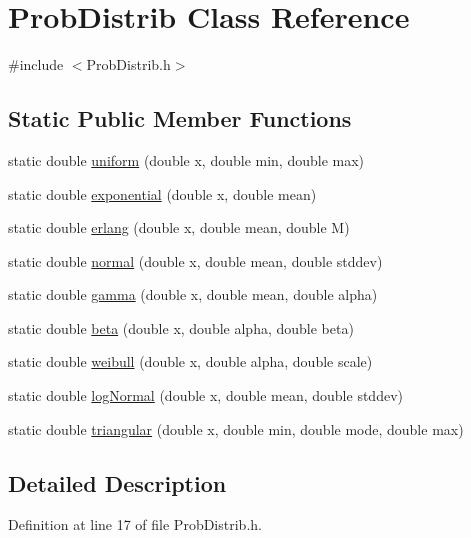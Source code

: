 \hypertarget{class_prob_distrib}{\section{Prob\-Distrib Class Reference}
\label{class_prob_distrib}
}


{\ttfamily \#include $<$Prob\-Distrib.\-h$>$}

\subsection*{Static Public Member Functions}
\begin{DoxyCompactItemize}
\item 
static double \hyperlink{class_prob_distrib_a4ff9f4d4faa1c29eb970c2629b332032}{uniform} (double x, double min, double max)
\item 
static double \hyperlink{class_prob_distrib_ad638ee57a1ad9ffe4a81e6f7607736a2}{exponential} (double x, double mean)
\item 
static double \hyperlink{class_prob_distrib_abeca85f25317ff97d9ca14d6a4abbb2d}{erlang} (double x, double mean, double M)
\item 
static double \hyperlink{class_prob_distrib_a5ca4ebda2818070339b707a880e3d1a4}{normal} (double x, double mean, double stddev)
\item 
static double \hyperlink{class_prob_distrib_a2a5a2f10a9ba6475591597643b555ab9}{gamma} (double x, double mean, double alpha)
\item 
static double \hyperlink{class_prob_distrib_af74e5c70a59727220d52a7f445992b28}{beta} (double x, double alpha, double beta)
\item 
static double \hyperlink{class_prob_distrib_a74aadd83aaa5459d3a9dd534f6dce82a}{weibull} (double x, double alpha, double scale)
\item 
static double \hyperlink{class_prob_distrib_ad6e3ae223763aae5c2fe7d347523adbb}{log\-Normal} (double x, double mean, double stddev)
\item 
static double \hyperlink{class_prob_distrib_a057f5c5a97ab296f60b1a92ec1886162}{triangular} (double x, double min, double mode, double max)
\end{DoxyCompactItemize}


\subsection{Detailed Description}


Definition at line 17 of file Prob\-Distrib.\-h.



